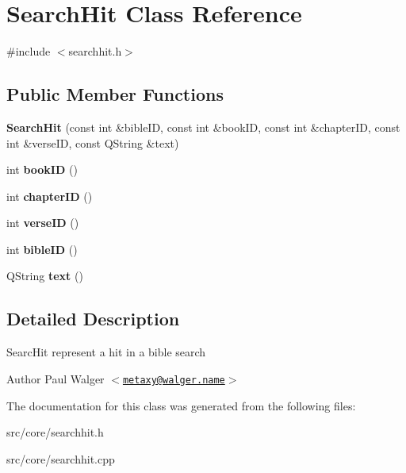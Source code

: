 \hypertarget{classSearchHit}{
\section{SearchHit Class Reference}
\label{classSearchHit}
}


{\ttfamily \#include $<$searchhit.h$>$}

\subsection*{Public Member Functions}
\begin{DoxyCompactItemize}
\item 
\hypertarget{classSearchHit_af526354ebfb42d6091f3da55117e9958}{
{\bfseries SearchHit} (const int \&bibleID, const int \&bookID, const int \&chapterID, const int \&verseID, const QString \&text)}
\label{classSearchHit_af526354ebfb42d6091f3da55117e9958}

\item 
\hypertarget{classSearchHit_a9c78f4832e60f93571f15e89e30c6191}{
int {\bfseries bookID} ()}
\label{classSearchHit_a9c78f4832e60f93571f15e89e30c6191}

\item 
\hypertarget{classSearchHit_a40a5c7eabd87ef4a0987b52da95929d3}{
int {\bfseries chapterID} ()}
\label{classSearchHit_a40a5c7eabd87ef4a0987b52da95929d3}

\item 
\hypertarget{classSearchHit_a1dd0cd0b18ff52629b476f129cc53377}{
int {\bfseries verseID} ()}
\label{classSearchHit_a1dd0cd0b18ff52629b476f129cc53377}

\item 
\hypertarget{classSearchHit_aaf59f8e8b54164c9d369b8148bfb5e18}{
int {\bfseries bibleID} ()}
\label{classSearchHit_aaf59f8e8b54164c9d369b8148bfb5e18}

\item 
\hypertarget{classSearchHit_ae7c70f7ec454099ae9a052a4e4efa6a4}{
QString {\bfseries text} ()}
\label{classSearchHit_ae7c70f7ec454099ae9a052a4e4efa6a4}

\end{DoxyCompactItemize}


\subsection{Detailed Description}
SearcHit represent a hit in a bible search

\begin{DoxyAuthor}{Author}
Paul Walger $<$\href{mailto:metaxy@walger.name}{\tt metaxy@walger.name}$>$ 
\end{DoxyAuthor}


The documentation for this class was generated from the following files:\begin{DoxyCompactItemize}
\item 
src/core/searchhit.h\item 
src/core/searchhit.cpp\end{DoxyCompactItemize}
